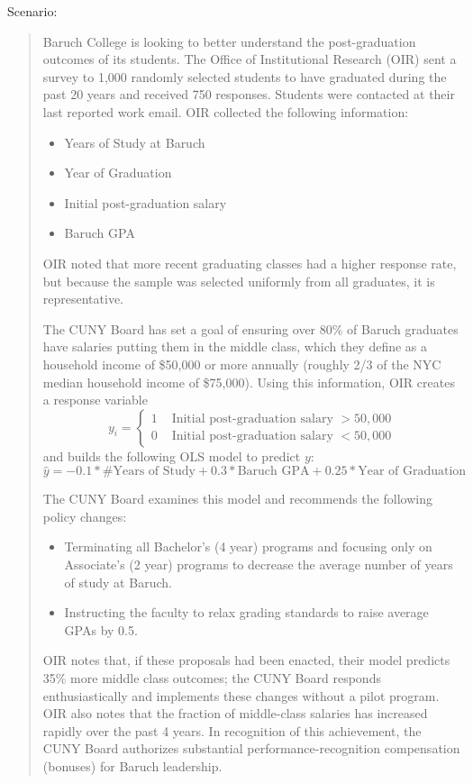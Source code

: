 \documentclass[12pt]{article}
\begin{document}
Scenario:
\begin{quote}
    Baruch College is looking to better understand the post-graduation outcomes of its students. The Office of Institutional Research (OIR) sent a survey to 1,000
    randomly selected students to have graduated during the past 20 years and received 750 responses. Students were contacted at their last reported work email. OIR collected the following information:
    \begin{itemize}
        \item Years of Study at Baruch
        \item Year of Graduation
        \item Initial post-graduation salary
        \item Baruch GPA
    \end{itemize}
    OIR noted that more recent graduating classes had a higher response rate, but because the sample was selected uniformly from all graduates, it is representative.
    
    The CUNY Board has set a goal of ensuring over 80\% of Baruch graduates have salaries putting them in the middle class, which they define as a household income of \$50,000 or more annually (roughly 2/3 of the NYC median household income of \$75,000). Using this information, OIR creates a response variable 
    \[y_i = \begin{cases} 1 & \text{ Initial post-graduation salary } > 50,000 \\ 0 & \text{ Initial post-graduation salary } < 50,000 \end{cases} \] and builds the following OLS model to predict $y$:
    \[\hat{y} = -0.1 * \text{\# Years of Study} + 0.3* \text{Baruch GPA} + 0.25 * \text{Year of Graduation} \]
    
    The CUNY Board examines this model and recommends the following policy changes:
    \begin{itemize}
        \item Terminating all Bachelor's (4 year) programs and focusing only on Associate's (2 year) programs to decrease the average number of years of study at Baruch.
        \item Instructing the faculty to relax grading standards to raise average GPAs by 0.5.
    \end{itemize}
    OIR notes that, if these proposals had been enacted, their model predicts 35\% more middle class outcomes; the CUNY Board responds enthusiastically and implements these changes without a pilot program. OIR also notes that the fraction of middle-class salaries has increased rapidly over the past 4 years. In recognition of this achievement, the CUNY Board authorizes substantial performance-recognition compensation (bonuses) for Baruch leadership.
    
\end{quote}
\end{document}
